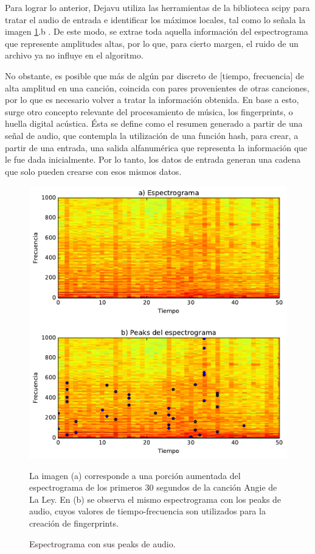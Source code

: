 Para lograr lo anterior, Dejavu utiliza las herramientas de la biblioteca scipy para tratar el audio de entrada e identificar los máximos locales, tal como lo señala la imagen \ref{fig:EspectrogramasDePeaks}.b . De este modo, se extrae toda aquella información del espectrograma que represente amplitudes altas, por lo que, para cierto margen, el ruido de un archivo ya no influye en el algoritmo.

No obstante, es posible que más de algún par discreto de [tiempo, frecuencia] de alta amplitud en una canción, coincida con pares provenientes de otras canciones, por lo que es necesario volver a tratar la información obtenida. En base a esto, surge otro concepto relevante del procesamiento de música, los fingerprints, o huella digital acústica. Ésta se define como el resumen generado a partir de una señal de audio, que contempla la utilización de una función hash, para crear, a partir de una entrada, una salida alfanumérica que representa la información que le fue dada inicialmente. Por lo tanto, los datos de entrada generan una cadena que solo pueden crearse con esos mismos datos.

\begin{figure}[h!]
    \centering
    \includegraphics[scale=0.7]{graficos/EspectrogramasDePeaks.pdf}
    \caption{Espectrograma con sus peaks de audio.}{La imagen (a) corresponde a una porción aumentada del espectrograma de los primeros 30 segundos de la canción Angie de La Ley. En (b) se observa el mismo espectrograma con los peaks de audio, cuyos valores de tiempo-frecuencia son utilizados para la creación de fingerprints.}
    \label{fig:EspectrogramasDePeaks}
\end{figure}


